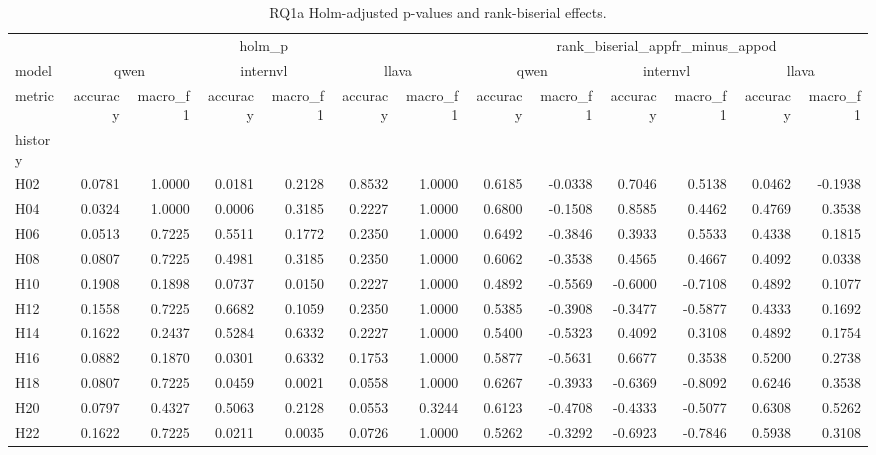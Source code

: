 \begin{table}[tbp]
\caption{RQ1a Holm-adjusted p-values and rank-biserial effects.}
\label{tab:rq1a_statistics_wide}
\begin{tabular}{lrrrrrrrrrrrr}
\toprule
 & \multicolumn{6}{c}{holm\_p} & \multicolumn{6}{c}{rank\_biserial\_appfr\_minus\_appod} \\
model & \multicolumn{2}{c}{qwen} & \multicolumn{2}{c}{internvl} & \multicolumn{2}{c}{llava} & \multicolumn{2}{c}{qwen} & \multicolumn{2}{c}{internvl} & \multicolumn{2}{c}{llava} \\
metric & accuracy & macro\_f1 & accuracy & macro\_f1 & accuracy & macro\_f1 & accuracy & macro\_f1 & accuracy & macro\_f1 & accuracy & macro\_f1 \\
history &  &  &  &  &  &  &  &  &  &  &  &  \\
\midrule
H02 & 0.0781 & 1.0000 & 0.0181 & 0.2128 & 0.8532 & 1.0000 & 0.6185 & -0.0338 & 0.7046 & 0.5138 & 0.0462 & -0.1938 \\
H04 & 0.0324 & 1.0000 & 0.0006 & 0.3185 & 0.2227 & 1.0000 & 0.6800 & -0.1508 & 0.8585 & 0.4462 & 0.4769 & 0.3538 \\
H06 & 0.0513 & 0.7225 & 0.5511 & 0.1772 & 0.2350 & 1.0000 & 0.6492 & -0.3846 & 0.3933 & 0.5533 & 0.4338 & 0.1815 \\
H08 & 0.0807 & 0.7225 & 0.4981 & 0.3185 & 0.2350 & 1.0000 & 0.6062 & -0.3538 & 0.4565 & 0.4667 & 0.4092 & 0.0338 \\
H10 & 0.1908 & 0.1898 & 0.0737 & 0.0150 & 0.2227 & 1.0000 & 0.4892 & -0.5569 & -0.6000 & -0.7108 & 0.4892 & 0.1077 \\
H12 & 0.1558 & 0.7225 & 0.6682 & 0.1059 & 0.2350 & 1.0000 & 0.5385 & -0.3908 & -0.3477 & -0.5877 & 0.4333 & 0.1692 \\
H14 & 0.1622 & 0.2437 & 0.5284 & 0.6332 & 0.2227 & 1.0000 & 0.5400 & -0.5323 & 0.4092 & 0.3108 & 0.4892 & 0.1754 \\
H16 & 0.0882 & 0.1870 & 0.0301 & 0.6332 & 0.1753 & 1.0000 & 0.5877 & -0.5631 & 0.6677 & 0.3538 & 0.5200 & 0.2738 \\
H18 & 0.0807 & 0.7225 & 0.0459 & 0.0021 & 0.0558 & 1.0000 & 0.6267 & -0.3933 & -0.6369 & -0.8092 & 0.6246 & 0.3538 \\
H20 & 0.0797 & 0.4327 & 0.5063 & 0.2128 & 0.0553 & 0.3244 & 0.6123 & -0.4708 & -0.4333 & -0.5077 & 0.6308 & 0.5262 \\
H22 & 0.1622 & 0.7225 & 0.0211 & 0.0035 & 0.0726 & 1.0000 & 0.5262 & -0.3292 & -0.6923 & -0.7846 & 0.5938 & 0.3108 \\

\end{tabular}
\end{table}
